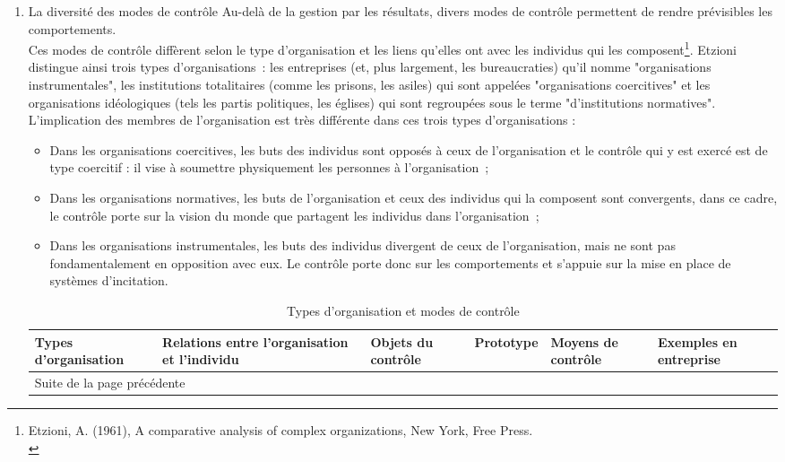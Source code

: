 \documentclass{tufte-handout}
\begin{document}
\begin{enumerate}
\noindent\rule{\textwidth}{0.5pt}

\item La diversité des modes de contrôle
\label{sec:org53c4d9a}
Au-delà de la gestion par les résultats, divers modes de contrôle permettent de rendre prévisibles les comportements.\\

Ces modes de contrôle diffèrent selon le type d'organisation et les liens qu'elles ont avec les individus qui les composent\footnote{Etzioni, A. (1961), A comparative analysis of complex organizations, New York, Free Press.\\}. Etzioni distingue ainsi trois types d'organisations : les entreprises (et, plus largement, les bureaucraties) qu'il nomme "organisations instrumentales", les institutions totalitaires (comme les prisons, les asiles) qui sont appelées "organisations coercitives" et les organisations idéologiques (tels les partis politiques, les églises) qui sont regroupées sous le terme "d'institutions normatives".\\

L'implication des membres de l'organisation est très différente dans ces trois types d'organisations :\\
\begin{itemize}
\item Dans les organisations coercitives, les buts des individus sont opposés à ceux de l'organisation et le contrôle qui y est exercé est de type coercitif : il vise à soumettre physiquement les personnes à l'organisation ;\\
\item Dans les organisations normatives, les buts de l'organisation et ceux des individus qui la composent sont convergents, dans ce cadre, le contrôle porte sur la vision du monde que partagent les individus dans l'organisation ;\\
\item Dans les organisations instrumentales, les buts des individus divergent de ceux de l'organisation, mais ne sont pas fondamentalement en opposition avec eux. Le contrôle porte donc sur les comportements et s'appuie sur la mise en place de systèmes d'incitation.\\
\end{itemize}

\begin{longtable}{|p{2cm}|p{3cm}|p{2cm}|p{2cm}|p{2cm}|p{2cm}|}
\caption{Types d'organisation et modes de contrôle}
\\
Types d'organisation & Relations entre l'organisation et l'individu & Objets du contrôle & Prototype & Moyens de contrôle & Exemples en entreprise\\
\hline
\endfirsthead
\multicolumn{6}{l}{Suite de la page précédente} \\
\hline


\end{longtable}
\end{enumerate}
\end{document}
